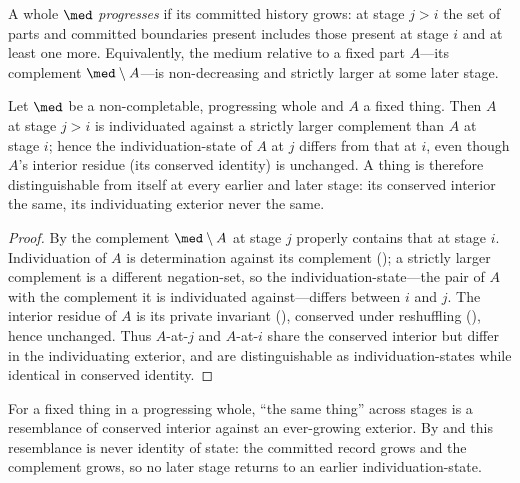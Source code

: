 \begin{definition}
\label{def:progressing}
A whole $\med$ \emph{progresses} if its committed history grows: at stage $j>i$
the set of parts and committed boundaries present includes those present at stage
$i$ and at least one more. Equivalently, the medium relative to a fixed part
$A$---its complement $\med\setminus A$---is non-decreasing and strictly larger at
some later stage.
\end{definition}

\begin{theorem}
\label{thm:temporal-nonreturn}
Let $\med$ be a non-completable, progressing whole and $A$ a fixed thing. Then
$A$ at stage $j>i$ is individuated against a strictly larger complement than $A$
at stage $i$; hence the individuation-state of $A$ at $j$ differs from that at
$i$, even though $A$'s interior residue \textup{(}its conserved identity\textup{)}
is unchanged. A thing is therefore distinguishable from itself at every earlier
and later stage: its conserved interior the same, its individuating exterior never
the same.
\end{theorem}

\begin{proof}
By  the complement $\med\setminus A$ at stage $j$ properly
contains that at stage $i$. Individuation of $A$ is determination against its
complement (); a strictly larger complement is a different
negation-set, so the individuation-state---the pair of $A$ with the complement it
is individuated against---differs between $i$ and $j$. The interior residue of $A$
is its private invariant (), conserved under reshuffling
(), hence unchanged. Thus $A$-at-$j$ and $A$-at-$i$ share the
conserved interior but differ in the individuating exterior, and are
distinguishable as individuation-states while identical in conserved identity.
\end{proof}

\begin{corollary}
\label{cor:same-different}
For a fixed thing in a progressing whole, ``the same thing'' across stages is a
resemblance of conserved interior against an ever-growing exterior. By
 and  this resemblance is never
identity of state: the committed record grows and the complement grows, so no
later stage returns to an earlier individuation-state.
\end{corollary}

